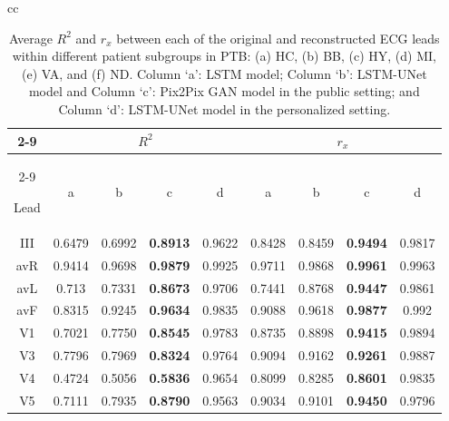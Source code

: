 

\begin{table}[t!]
\begin{center}
\caption{Average $R^2$ and $r_x$ between each of the original and reconstructed ECG leads within different patient subgroups in PTB: (a) HC, (b) BB, (c) HY, (d) MI, (e) VA, and (f) ND. Column `a': LSTM model; Column `b': LSTM-UNet model and Column `c': Pix2Pix GAN model in the public setting; and Column `d': LSTM-UNet model in the personalized setting. 
}
\renewcommand{\arraystretch}{1.2}
\renewcommand{\tabcolsep}{3pt}
\begin{tabular}{cc}
{
\begin{footnotesize}
\begin{tabular}{|c|cccc|cccc|}
\hline

\cline{2-9}
& \multicolumn{4}{c|}{$R^2$}
& \multicolumn{4}{c|}{$r_x$} \\
\cline{2-9}

Lead & a & b & c & d & a & b & c & d \\
\hline
III &  0.6479 & 0.6992 & \textbf{0.8913} & 0.9622 & 0.8428 & 0.8459 & \textbf{0.9494} & 0.9817
 \\

avR & 0.9414 & 0.9698 & \textbf{0.9879} & 0.9925 & 0.9711 & 0.9868 & \textbf{0.9961} & 0.9963
  \\

avL & 0.713 & 0.7331 & \textbf{0.8673} & 0.9706 & 0.7441 & 0.8768 & \textbf{0.9447} & 0.9861
  \\

avF & 0.8315 & 0.9245 & \textbf{0.9634} & 0.9835 & 0.9088 & 0.9618 & \textbf{0.9877} & 0.992
  \\

V1 & 0.7021 & 0.7750 & \textbf{0.8545} & 0.9783 & 0.8735 & 0.8898 & \textbf{0.9415} & 0.9894
  \\

V3 & 0.7796 & 0.7969 & \textbf{0.8324} & 0.9764 & 0.9094 & 0.9162 & \textbf{0.9261} & 0.9887
  \\

V4 & 0.4724 & 0.5056 & \textbf{0.5836} & 0.9654 & 0.8099 & 0.8285 & \textbf{0.8601} & 0.9835
  \\

V5 & 0.7111 & 0.7935 & \textbf{0.8790} & 0.9563 & 0.9034 & 0.9101 & \textbf{0.9450} & 0.9796
  \\


\end{tabular}
\end{footnotesize}}
\end{tabular}
\end{center}
\end{table}
